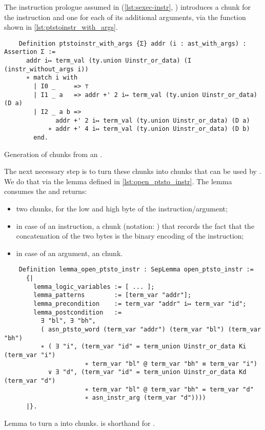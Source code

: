 The instruction prologue assumed in  (\cref{lst:sexec-instr}, ) introduces a  chunk for the instruction and one for each of its additional arguments, via the  function shown in \cref{lst:ptstoinstr_with_args}.

\begin{listing}[htb]
  \begin{verbatim}
    Definition ptstoinstr_with_args {Σ} addr (i : ast_with_args) : Assertion Σ :=
      addr i↦ term_val (ty.union Uinstr_or_data) (I (instr_without_args i))
      ∗ match i with
        | I0 _     => ⊤
        | I1 _ a   => addr +' 2 i↦ term_val (ty.union Uinstr_or_data) (D a)
        | I2 _ a b =>
              addr +' 2 i↦ term_val (ty.union Uinstr_or_data) (D a)
            ∗ addr +' 4 i↦ term_val (ty.union Uinstr_or_data) (D b)
        end.
  \end{verbatim}
  \caption{Generation of  chunks from an .}
  \label{lst:ptstoinstr_with_args}
\end{listing}

The next necessary step is to turn these  chunks into  chunks that can be used by . We do that via the  lemma defined in \ref{lst:open_ptsto_instr}. The lemma consumes the  and returns:
\begin{itemize}
\item two  chunks, for the low and high byte of the instruction/argument;
\item in case of an instruction, a  chunk (notation: ) that records the fact that the concatenation of the two bytes is the binary encoding of the instruction;
\item in case of an argument, an  chunk.
\end{itemize}

\begin{listing}[htb]
  \begin{verbatim}
    Definition lemma_open_ptsto_instr : SepLemma open_ptsto_instr :=
      {|
        lemma_logic_variables := [ ... ];
        lemma_patterns        := [term_var "addr"];
        lemma_precondition    := term_var "addr" i↦ term_var "id";
        lemma_postcondition   :=
          ∃ "bl", ∃ "bh",
          ( asn_ptsto_word (term_var "addr") (term_var "bl") (term_var "bh")
          ∗ ( ∃ "i", (term_var "id" = term_union Uinstr_or_data Ki (term_var "i")
                      ∗ term_var "bl" @ term_var "bh" ≡ term_var "i")
            ∨ ∃ "d", (term_var "id" = term_union Uinstr_or_data Kd (term_var "d")
                      ∗ term_var "bl" @ term_var "bh" = term_var "d"
                      ∗ asn_instr_arg (term_var "d"))))
      |}.
  \end{verbatim}
  \caption{Lemma to turn a  into  chunks.  is shorthand for .}
  \label{lst:open_ptsto_instr}
\end{listing}

